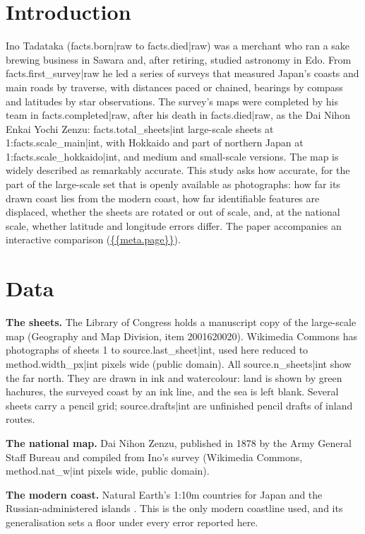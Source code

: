 \documentclass[11pt,a4paper]{article}
\begin{document}
\section{Introduction}
Ino Tadataka ({{facts.born|raw}} to {{facts.died|raw}}) was a merchant who ran a sake brewing business in Sawara and, after retiring, studied astronomy in Edo. From {{facts.first_survey|raw}} he led a series of surveys that measured Japan's coasts and main roads by traverse, with distances paced or chained, bearings by compass and latitudes by star observations. The survey's maps were completed by his team in {{facts.completed|raw}}, after his death in {{facts.died|raw}}, as the Dai Nihon Enkai Yochi Zenzu: {{facts.total_sheets|int}} large-scale sheets at 1:{{facts.scale_main|int}}, with Hokkaido and part of northern Japan at 1:{{facts.scale_hokkaido|int}}, and medium and small-scale versions. The map is widely described as remarkably accurate. This study asks how accurate, for the part of the large-scale set that is openly available as photographs: how far its drawn coast lies from the modern coast, how far identifiable features are displaced, whether the sheets are rotated or out of scale, and, at the national scale, whether latitude and longitude errors differ. The paper accompanies an interactive comparison (\url{{{meta.page}}}).

\section{Data}
\textbf{The sheets.} The Library of Congress holds a manuscript copy of the large-scale map (Geography and Map Division, item 2001620020). Wikimedia Commons has photographs of sheets 1 to {{source.last_sheet|int}}, used here reduced to {{method.width_px|int}} pixels wide (public domain). All {{source.n_sheets|int}} show the far north. They are drawn in ink and watercolour: land is shown by green hachures, the surveyed coast by an ink line, and the sea is left blank. Several sheets carry a pencil grid; {{source.drafts|int}} are unfinished pencil drafts of inland routes.

\textbf{The national map.} Dai Nihon Zenzu, published in 1878 by the Army General Staff Bureau and compiled from Ino's survey (Wikimedia Commons, {{method.nat_w|int}} pixels wide, public domain).

\textbf{The modern coast.} Natural Earth's 1:10m countries for Japan and the Russian-administered islands \citep{naturalearth}. This is the only modern coastline used, and its generalisation sets a floor under every error reported here.
\end{document}
